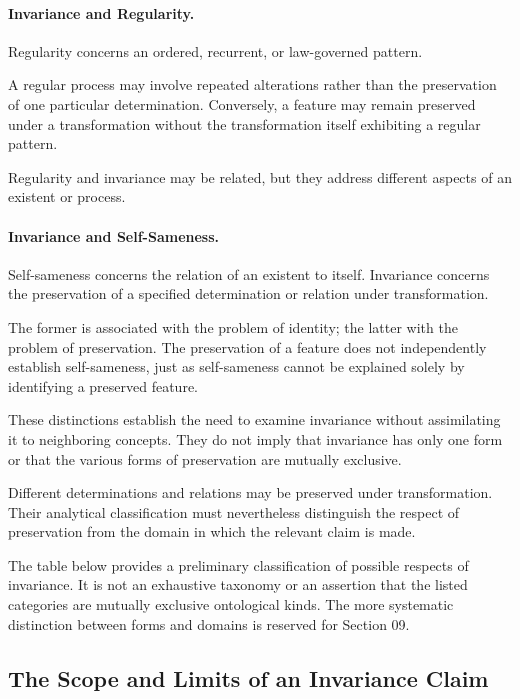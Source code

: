 \paragraph{Invariance and Regularity.}

Regularity concerns an ordered, recurrent, or
law-governed pattern.

A regular process may involve repeated alterations
rather than the preservation of one particular
determination. Conversely, a feature may remain
preserved under a transformation without the
transformation itself exhibiting a regular pattern.

Regularity and invariance may be related, but they
address different aspects of an existent or process.

\paragraph{Invariance and Self-Sameness.}

Self-sameness concerns the relation of an existent
to itself. Invariance concerns the preservation
of a specified determination or relation under
transformation.

The former is associated with the problem of identity;
the latter with the problem of preservation.
The preservation of a feature does not independently
establish self-sameness, just as self-sameness cannot
be explained solely by identifying a preserved feature.

These distinctions establish the need to examine
invariance without assimilating it to neighboring
concepts. They do not imply that invariance has
only one form or that the various forms of preservation
are mutually exclusive.

Different determinations and relations may be preserved
under transformation. Their analytical classification
must nevertheless distinguish the respect of preservation
from the domain in which the relevant claim is made.

The table below provides a preliminary classification
of possible respects of invariance. It is not an
exhaustive taxonomy or an assertion that the listed
categories are mutually exclusive ontological kinds.
The more systematic distinction between forms and
domains is reserved for Section 09.



\subsection{The Scope and Limits of an Invariance Claim}


